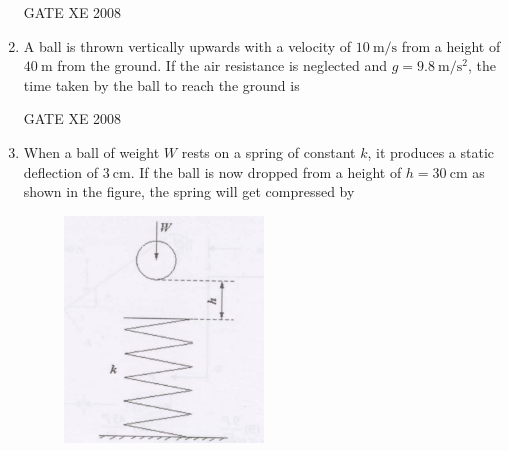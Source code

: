\documentclass[12pt]{article}
\begin{document}
\begin{enumerate}[label=Q\arabic*.]
\begin{enumerate}[label=(\Alph*)]
\end{enumerate}

    GATE XE 2008

    \item A ball is thrown vertically upwards with a velocity of $10 \ \mathrm{m/s}$ from a height of $40 \ \mathrm{m}$ from the ground. If the air resistance is neglected and $g = 9.8 \ \mathrm{m/s^2}$, the time taken by the ball to reach the ground is

\begin{enumerate}[label=(\Alph*)]
\end{enumerate}

    GATE XE 2008


    \item When a ball of weight $W$ rests on a spring of constant $k$, it produces a static deflection of $3\ \mathrm{cm}$. If the ball is now dropped from a height of $h = 30\ \mathrm{cm}$ as shown in the figure, the spring will get compressed by  

    \begin{figure}[H]
    \centering
    \includegraphics[width=0.5\textwidth]{figs/ass1_f_q20.png}
    \caption{}
    \end{figure}


\end{enumerate}
\end{document}
